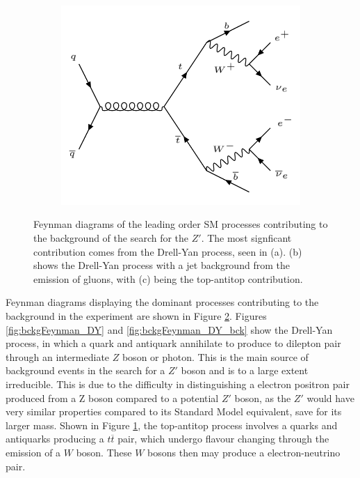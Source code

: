 \documentclass{article}
\begin{document}
\begin{figure}[h]
\begin{subfigure}{.35\textwidth}
        \includegraphics[height=\textwidth]{images/ttbar.png}
        \caption{}
        \label{fig:bckgFeynman_ttbar}
    \end{subfigure}
    \caption{Feynman diagrams of the leading order SM processes contributing to the background of the search for the $Z'$. The most signficant contribution comes from the Drell-Yan process, seen in (a). (b) shows the Drell-Yan process with a jet background from the emission of gluons, with (c) being the top-antitop contribution.\label{fig:bckgFeynman1}}
\end{figure}

Feynman diagrams displaying the dominant processes contributing to the background in the experiment are shown in Figure \ref{fig:bckgFeynman1}. Figures \ref{fig:bckgFeynman_DY} and \ref{fig:bckgFeynman_DY_bck} show the Drell-Yan process, in which a quark and antiquark annihilate to produce to dilepton pair through an intermediate $Z$ boson or photon. This is the main source of background events in the search for a $Z'$ boson and is to a large extent irreducible. This is due to the difficulty in distinguishing a electron positron pair produced from a Z boson compared to a potential $Z'$ boson, as the $Z'$ would have very similar properties compared to its Standard Model equivalent, save for its larger mass. Shown in Figure \ref{fig:bckgFeynman_ttbar}, the top-antitop process involves a quarks and antiquarks producing a $t\overline{t}$ pair, which undergo flavour changing through the emission of a $W$ boson. These $W$ bosons then may produce a electron-neutrino pair.
\end{document}
